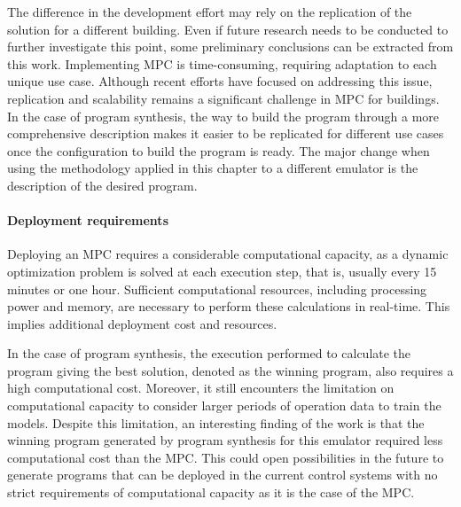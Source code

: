 The difference in the development effort may rely on the replication of the solution for a different building. Even if future research needs to be conducted to further investigate this point, some preliminary conclusions can be extracted from this work. Implementing MPC is time-consuming, requiring adaptation to each unique use case. Although recent efforts have focused on addressing this issue, replication and scalability remains a significant challenge in MPC for buildings. In the case of program synthesis, the way to build the program through a more comprehensive description makes it easier to be replicated for different use cases once the configuration to build the program is ready. The major change when using the methodology applied in this chapter to a different emulator is the description of the desired program.

\paragraph{Deployment requirements}
Deploying an MPC requires a considerable computational capacity, as a dynamic optimization problem is solved at each execution step, that is, usually every 15 minutes or one hour. Sufficient computational resources, including processing power and memory, are necessary to perform these calculations in real-time. This implies additional deployment cost and resources.

In the case of program synthesis, the execution performed to calculate the program giving the best solution, denoted as the winning program, also requires a high computational cost. Moreover, it still encounters the limitation on computational capacity to consider larger periods of operation data to train the models. Despite this limitation, an interesting finding of the work is that the winning program generated by program synthesis for this emulator required less computational cost than the MPC. This could open possibilities in the future to generate programs that can be deployed in the current control systems with no strict requirements of computational capacity as it is the case of the MPC.

\newpage
